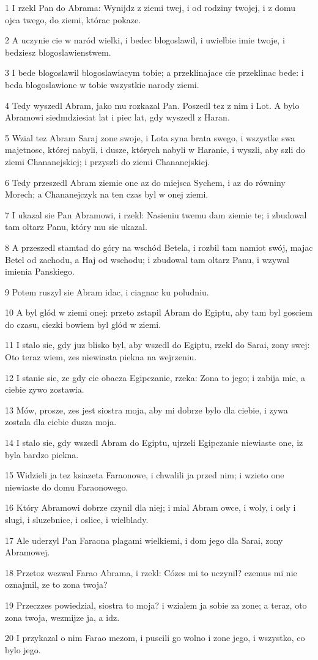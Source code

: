 \par 1 I rzekl Pan do Abrama: Wynijdz z ziemi twej, i od rodziny twojej, i z domu ojca twego, do ziemi, którac pokaze.
\par 2 A uczynie cie w naród wielki, i bedec blogoslawil, i uwielbie imie twoje, i bedziesz blogoslawienstwem.
\par 3 I bede blogoslawil blogoslawiacym tobie; a przeklinajace cie przeklinac bede: i beda blogoslawione w tobie wszystkie narody ziemi.
\par 4 Tedy wyszedl Abram, jako mu rozkazal Pan. Poszedl tez z nim i Lot. A bylo Abramowi siedmdziesiat lat i piec lat, gdy wyszedl z Haran.
\par 5 Wzial tez Abram Saraj zone swoje, i Lota syna brata swego, i wszystke swa majetnosc, której nabyli, i dusze, których nabyli w Haranie, i wyszli, aby szli do ziemi Chananejskiej; i przyszli do ziemi Chananejskiej.
\par 6 Tedy przeszedl Abram ziemie one az do miejsca Sychem, i az do równiny Morech; a Chananejczyk na ten czas byl w onej ziemi.
\par 7 I ukazal sie Pan Abramowi, i rzekl: Nasieniu twemu dam ziemie te; i zbudowal tam oltarz Panu, który mu sie ukazal.
\par 8 A przeszedl stamtad do góry na wschód Betela, i rozbil tam namiot swój, majac Betel od zachodu, a Haj od wschodu; i zbudowal tam oltarz Panu, i wzywal imienia Panskiego.
\par 9 Potem ruszyl sie Abram idac, i ciagnac ku poludniu.
\par 10 A byl glód w ziemi onej: przeto zstapil Abram do Egiptu, aby tam byl gosciem do czasu, ciezki bowiem byl glód w ziemi.
\par 11 I stalo sie, gdy juz blisko byl, aby wszedl do Egiptu, rzekl do Sarai, zony swej: Oto teraz wiem, zes niewiasta piekna na wejrzeniu.
\par 12 I stanie sie, ze gdy cie obacza Egipczanie, rzeka: Zona to jego; i zabija mie, a ciebie zywo zostawia.
\par 13 Mów, prosze, zes jest siostra moja, aby mi dobrze bylo dla ciebie, i zywa zostala dla ciebie dusza moja.
\par 14 I stalo sie, gdy wszedl Abram do Egiptu, ujrzeli Egipczanie niewiaste one, iz byla bardzo piekna.
\par 15 Widzieli ja tez ksiazeta Faraonowe, i chwalili ja przed nim; i wzieto one niewiaste do domu Faraonowego.
\par 16 Który Abramowi dobrze czynil dla niej; i mial Abram owce, i woly, i osly i slugi, i sluzebnice, i oslice, i wielblady.
\par 17 Ale uderzyl Pan Faraona plagami wielkiemi, i dom jego dla Sarai, zony Abramowej.
\par 18 Przetoz wezwal Farao Abrama, i rzekl: Cózes mi to uczynil? czemus mi nie oznajmil, ze to zona twoja?
\par 19 Przeczzes powiedzial, siostra to moja? i wzialem ja sobie za zone; a teraz, oto zona twoja, wezmijze ja, a idz.
\par 20 I przykazal o nim Farao mezom, i puscili go wolno i zone jego, i wszystko, co bylo jego.

